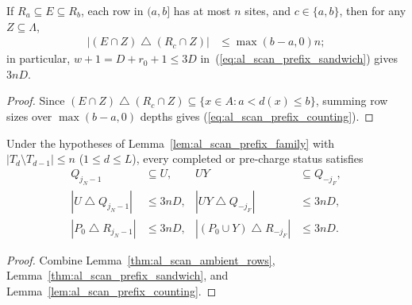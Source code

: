 \begin{lemma}
    \label{lem:al_scan_prefix_counting}
    \leanok
    If $R_a\subseteq E\subseteq R_b$, each row in $(a,b]$ has at most $n$
    sites, and $c\in\{a,b\}$, then for any $Z\subseteq\Lambda$,
    \begin{align}
        |(E\cap Z)\mathbin{\triangle}(R_c\cap Z)|
         & \le \max(b-a,0)n;
        \label{eq:al_scan_prefix_counting}
    \end{align}
    in particular, $w+1=D+r_0+1\le3D$ in~(\ref{eq:al_scan_prefix_sandwich})
    gives $3nD$.
\end{lemma}
\begin{proof}\leanok
    Since $(E\cap Z)\mathbin{\triangle}(R_c\cap Z)\subseteq\{x\in A:a<d(x)\le b\}$,
    summing row sizes over $\max(b-a,0)$ depths gives
    (\ref{eq:al_scan_prefix_counting}).
\end{proof}

\begin{lemma}
    \label{thm:al_scan_physical_prefix_approximation}
    \leanok
    Under the hypotheses of Lemma~\ref{lem:al_scan_prefix_family} with
    $|T_d\setminus T_{d-1}|\le n$ ($1\le d\le L$), every completed or pre-charge
    status satisfies
    \begin{align}
        Q_{j_N-1}                                & \subseteq U, & UY & \subseteq Q_{-j_F}, \\
        |U\mathbin{\triangle}Q_{j_N-1}|          & \le3nD,      &
        |UY\mathbin{\triangle}Q_{-j_F}|          & \le3nD,                                 \\
        |P_0\mathbin{\triangle}R_{j_N-1}|        & \le3nD,      &
        |(P_0\cup Y)\mathbin{\triangle}R_{-j_F}| & \le3nD.
        \label{eq:al_scan_physical_prefix_approximation}
    \end{align}
\end{lemma}
\begin{proof}\leanok
    Combine Lemma~\ref{thm:al_scan_ambient_rows},
    Lemma~\ref{thm:al_scan_prefix_sandwich}, and
    Lemma~\ref{lem:al_scan_prefix_counting}.
\end{proof}

